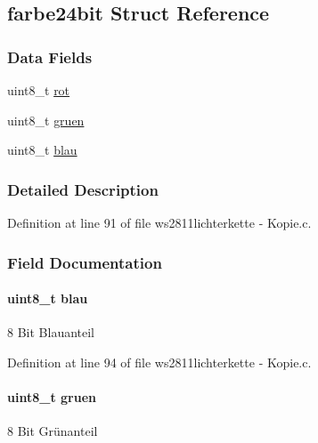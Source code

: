 \hypertarget{structfarbe24bit}{}\subsection{farbe24bit Struct Reference}
\label{structfarbe24bit}
\subsubsection*{Data Fields}
\begin{DoxyCompactItemize}
\item 
uint8\+\_\+t \hyperlink{structfarbe24bit_ad60cbe58e4e297fd42c0891c4fc2d290}{rot}
\item 
uint8\+\_\+t \hyperlink{structfarbe24bit_a787390a6942a5011aa43e001b2cf5883}{gruen}
\item 
uint8\+\_\+t \hyperlink{structfarbe24bit_a099fa3e0dafaf90fbbc921db345cb260}{blau}
\end{DoxyCompactItemize}


\subsubsection{Detailed Description}


Definition at line 91 of file ws2811lichterkette -\/ Kopie.\+c.



\subsubsection{Field Documentation}
\hypertarget{structfarbe24bit_a099fa3e0dafaf90fbbc921db345cb260}{}
\paragraph[{blau}]{\setlength{\rightskip}{0pt plus 5cm}uint8\+\_\+t blau}\label{structfarbe24bit_a099fa3e0dafaf90fbbc921db345cb260}
8 Bit Blauanteil 

Definition at line 94 of file ws2811lichterkette -\/ Kopie.\+c.

\hypertarget{structfarbe24bit_a787390a6942a5011aa43e001b2cf5883}{}
\paragraph[{gruen}]{\setlength{\rightskip}{0pt plus 5cm}uint8\+\_\+t gruen}\label{structfarbe24bit_a787390a6942a5011aa43e001b2cf5883}
8 Bit Grünanteil 


